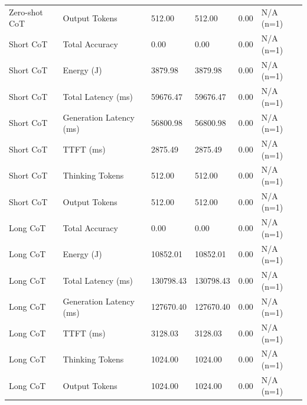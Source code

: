 \begin{table}
\begin{tabular}{llllll}
Zero-shot CoT & Output Tokens & 512.00 & 512.00 & 0.00 & N/A (n=1) \\
Short CoT & Total Accuracy & 0.00 & 0.00 & 0.00 & N/A (n=1) \\
Short CoT & Energy (J) & 3879.98 & 3879.98 & 0.00 & N/A (n=1) \\
Short CoT & Total Latency (ms) & 59676.47 & 59676.47 & 0.00 & N/A (n=1) \\
Short CoT & Generation Latency (ms) & 56800.98 & 56800.98 & 0.00 & N/A (n=1) \\
Short CoT & TTFT (ms) & 2875.49 & 2875.49 & 0.00 & N/A (n=1) \\
Short CoT & Thinking Tokens & 512.00 & 512.00 & 0.00 & N/A (n=1) \\
Short CoT & Output Tokens & 512.00 & 512.00 & 0.00 & N/A (n=1) \\
Long CoT & Total Accuracy & 0.00 & 0.00 & 0.00 & N/A (n=1) \\
Long CoT & Energy (J) & 10852.01 & 10852.01 & 0.00 & N/A (n=1) \\
Long CoT & Total Latency (ms) & 130798.43 & 130798.43 & 0.00 & N/A (n=1) \\
Long CoT & Generation Latency (ms) & 127670.40 & 127670.40 & 0.00 & N/A (n=1) \\
Long CoT & TTFT (ms) & 3128.03 & 3128.03 & 0.00 & N/A (n=1) \\
Long CoT & Thinking Tokens & 1024.00 & 1024.00 & 0.00 & N/A (n=1) \\
Long CoT & Output Tokens & 1024.00 & 1024.00 & 0.00 & N/A (n=1) \\
\bottomrule
\end{tabular}
\end{table}
